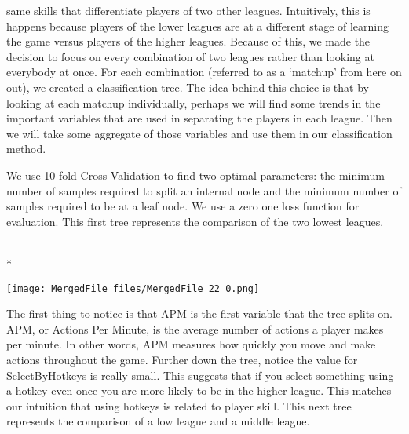 \documentclass[letterpaper,10pt,english]{/usr/share/sphinx/texinputs/sphinxhowto}
\def\smaller{\fontsize{9.5pt}{9.5pt}\selectfont}
\newenvironment{InvisibleVerbatim}
        {\begin{mdframed}[leftmargin=0.1\linewidth,innerleftmargin=3pt,innerrightmargin=3pt, userdefinedwidth=1\linewidth, linewidth=0pt, linecolor=white, usetwoside=false]}
        {\end{mdframed}}
\begin{document}
same skills that differentiate players of two other leagues.
Intuitively, this is happens because players of the lower leagues are at
a different stage of learning the game versus players of the higher
leagues. Because of this, we made the decision to focus on every
combination of two leagues rather than looking at everybody at once. For
each combination (referred to as a `matchup' from here on out), we
created a classification tree. The idea behind this choice is that by
looking at each matchup individually, perhaps we will find some trends
in the important variables that are used in separating the players in
each league. Then we will take some aggregate of those variables and use
them in our classification method.

We use 10-fold Cross Validation to find two optimal parameters: the
minimum number of samples required to split an internal node and the
minimum number of samples required to be at a leaf node. We use a zero
one loss function for evaluation.
\newpage
This first tree represents the comparison of the two lowest leagues.

    

        
        

            
                \makebox[0.1\linewidth]{\smaller\hfill\tt\color{nbframe-out-prompt}Out\hspace{4pt}{[}23{]}:\hspace{4pt}}\\*
                \vspace{-2.55\baselineskip}\begin{InvisibleVerbatim}
                \vspace{-0.5\baselineskip}
    \begin{center}
    \texttt{[image: MergedFile\_files/MergedFile\_22\_0.png]}
    \par
    \end{center}
    
            \end{InvisibleVerbatim}
            
        
    
The first thing to notice is that APM is the first variable that the
tree splits on. APM, or Actions Per Minute, is the average number of
actions a player makes per minute. In other words, APM measures how
quickly you move and make actions throughout the game. Further down the
tree, notice the value for SelectByHotkeys is really small. This
suggests that if you select something using a hotkey even once you are
more likely to be in the higher league. This matches our intuition that
using hotkeys is related to player skill.
\newpage
This next tree represents the comparison of a low league and a middle
league.
\end{document}
